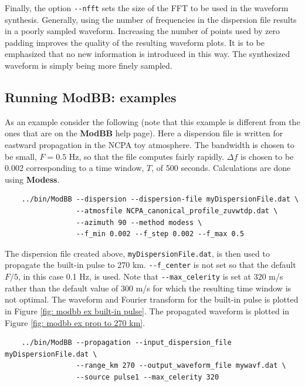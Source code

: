 Finally, the option \verb+--nfft+ sets the size of the FFT to be used in the waveform synthesis. Generally, using the number of frequencies in the dispersion file results in a poorly sampled waveform. Increasing the number of points used by zero padding improves the quality of the resulting waveform plots. It is to be emphasized that no new information is introduced in this way. The synthesized waveform is simply being more finely sampled. 

\subsection{Running ModBB: examples}
\label{sec: modbb examples}

As an example consider the following (note that this example is different from the ones that are on the {\bf ModBB} help page). Here a dispersion file is written for eastward propagation in the NCPA toy atmosphere. The bandwidth is chosen to be small, $F=0.5$ Hz, so that the file computes fairly rapidly. $\Delta f$ is chosen to be 0.002 corresponding to a time window, $T$, of 500 seconds. Calculations are done using {\bf Modess}. 

\begin{verbatim} 
    ../bin/ModBB --dispersion --dispersion-file myDispersionFile.dat \
                 --atmosfile NCPA_canonical_profile_zuvwtdp.dat \
                 --azimuth 90 --method modess \
                 --f_min 0.002 --f_step 0.002 --f_max 0.5
\end{verbatim}

The dispersion file created above, \verb+myDispersionFile.dat+, is then used to propagate the built-in pulse to 270 km. \verb+--f_center+ is not set so that the default $F/5$, in this case 0.1 Hz, is used. Note that \verb+--max_celerity+ is set at 320 m/s rather than the default value of 300 m/s for which the resulting time window is not optimal. The waveform and Fourier transform for the built-in pulse is plotted in Figure \ref{fig: modbb ex built-in pulse}. The propagated waveform is plotted in Figure \ref{fig: modbb ex prop to 270 km}. 

\begin{verbatim}
    ../bin/ModBB --propagation --input_dispersion_file myDispersionFile.dat \
                 --range_km 270 --output_waveform_file mywavf.dat \
                 --source pulse1 --max_celerity 320
\end{verbatim}

